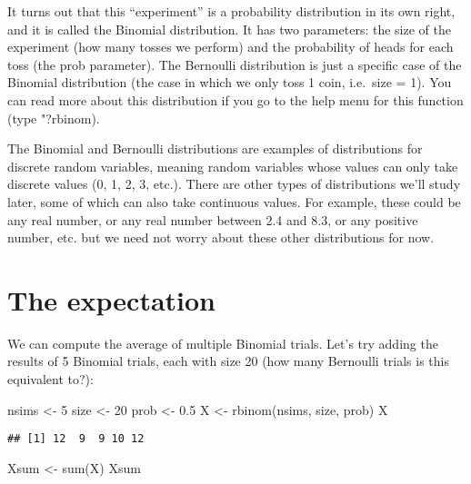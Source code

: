\documentclass[
]{book}
\newenvironment{Shaded}{\begin{snugshade}}{\end{snugshade}}
\newcommand{\DecValTok}[1]{\textcolor[rgb]{0.00,0.00,0.81}{#1}}
\newcommand{\FloatTok}[1]{\textcolor[rgb]{0.00,0.00,0.81}{#1}}
\newcommand{\FunctionTok}[1]{\textcolor[rgb]{0.00,0.00,0.00}{#1}}
\newcommand{\NormalTok}[1]{#1}
\newcommand{\OtherTok}[1]{\textcolor[rgb]{0.56,0.35,0.01}{#1}}
\begin{document}
It turns out that this ``experiment'' is a probability distribution in its own right, and it is called the Binomial distribution. It has two parameters: the size of the experiment (how many tosses we perform) and the probability of heads for each toss (the prob parameter). The Bernoulli distribution is just a specific case of the Binomial distribution (the case in which we only toss 1 coin, i.e.~size = 1). You can read more about this distribution if you go to the help menu for this function (type "?rbinom).

The Binomial and Bernoulli distributions are examples of distributions for discrete random variables, meaning random variables whose values can only take discrete values (0, 1, 2, 3, etc.). There are other types of distributions we'll study later, some of which can also take continuous values. For example, these could be any real number, or any real number between 2.4 and 8.3, or any positive number, etc. but we need not worry about these other distributions for now.

\hypertarget{the-expectation}{%
\section{The expectation}\label{the-expectation}}

We can compute the average of multiple Binomial trials. Let's try adding the results of 5 Binomial trials, each with size 20 (how many Bernoulli trials is this equivalent to?):

\begin{Shaded}
\begin{Highlighting}[]
\NormalTok{nsims }\OtherTok{\textless{}{-}} \DecValTok{5}
\NormalTok{size }\OtherTok{\textless{}{-}} \DecValTok{20}
\NormalTok{prob }\OtherTok{\textless{}{-}} \FloatTok{0.5}
\NormalTok{X }\OtherTok{\textless{}{-}} \FunctionTok{rbinom}\NormalTok{(nsims, size, prob)}
\NormalTok{X}
\end{Highlighting}
\end{Shaded}

\begin{verbatim}
## [1] 12  9  9 10 12
\end{verbatim}

\begin{Shaded}
\begin{Highlighting}[]
\NormalTok{Xsum }\OtherTok{\textless{}{-}} \FunctionTok{sum}\NormalTok{(X)}
\NormalTok{Xsum}
\end{Highlighting}
\end{Shaded}
\end{document}
